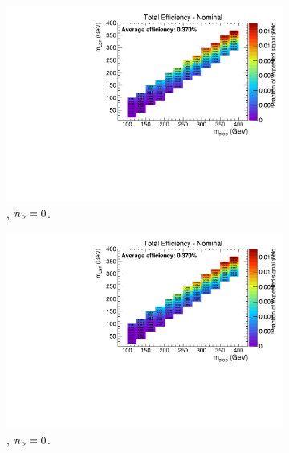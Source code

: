 \begin{figure}[ht!]
  \centering
  \begin{subfigure}[b]{0.32\textwidth}
    \includegraphics[width=\textwidth, page=4]{Figs/sms/t2degen/v5/bTag_T2_4body_v5_eq0b_le3j_incl.pdf}
    \caption{\njlow, $n_{\text{b}} = 0$.}
  \end{subfigure}
  \begin{subfigure}[b]{0.32\textwidth}
    \includegraphics[width=\textwidth, page=5]{Figs/sms/t2degen/v5/bTag_T2_4body_v5_eq0b_le3j_incl.pdf}
    \caption{\njlow, $n_{\text{b}} = 0$.}
  \end{subfigure}
  \begin{subfigure}[b]{0.32\textwidth}

\end{subfigure}
\end{figure}
